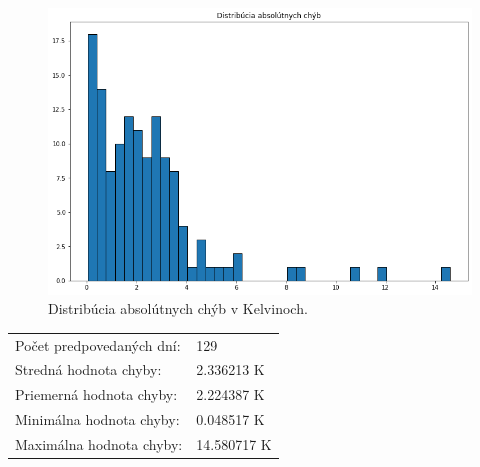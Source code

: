 \begin{figure}[!htbp]
  \centering
  \includegraphics[width=14cm]{img/dist_abs_chyby.png}
  \caption{Distribúcia absolútnych chýb v Kelvinoch.}
  \label{dest_abs_error}
\end{figure}

\begin{table}[]
\begin{tabular}{ll}
Počet predpovedaných dní: & 129       \\
Stredná hodnota chyby:    & 2.336213 K  \\
Priemerná hodnota chyby:  & 2.224387 K  \\
Minimálna hodnota chyby:  & 0.048517 K  \\
Maximálna hodnota chyby:  & 14.580717 K
\end{tabular}
\end{table}